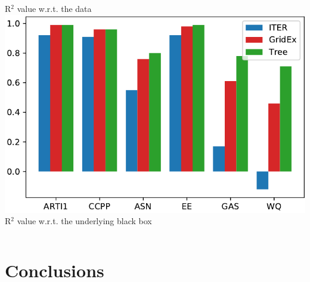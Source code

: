 \documentclass[presentation]{beamer}
\begin{document}
\begin{frame}[allowframebreaks]
\begin{columns}[t]
		 	R$^2$ value w.r.t. the data\vspace{10px}
			\includegraphics[width=.8\columnwidth]{img/comp/r2fid.pdf}\\
			R$^2$ value w.r.t. the underlying black box
	\end{columns}

\end{frame}

\section{Conclusions}
\end{document}
